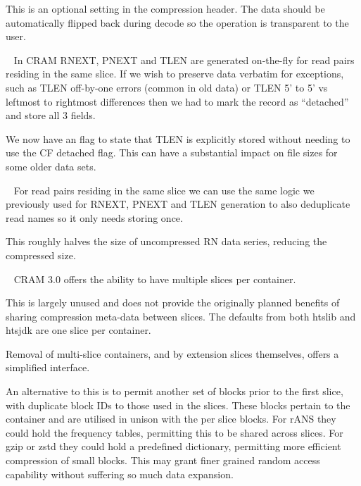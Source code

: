 \documentclass[a4paper]{article}
\begin{document}
\begin{description}
  This is an optional setting in the compression header.  The data
  should be automatically flipped back during decode so the operation
  is transparent to the user.


\item[New CF explicit template size flag]\ \newline
  In CRAM RNEXT, PNEXT and TLEN are generated on-the-fly for read
  pairs residing in the same slice.  If we wish to preserve data
  verbatim for exceptions, such as TLEN off-by-one errors (common in
  old data) or TLEN 5' to 5' vs leftmost to rightmost differences then
  we had to mark the record as ``detached'' and store all 3 fields.

  We now have an flag to state that TLEN is explicitly stored without
  needing to use the CF detached flag.  This can have a substantial
  impact on file sizes for some older data sets.


\item[Deduplication of read names]\ \newline
  For read pairs residing in the same slice we can use the same logic
  we previously used for RNEXT, PNEXT and TLEN generation to also
  deduplicate read names so it only needs storing once.

  This roughly halves the size of uncompressed RN data series,
  reducing the compressed size.

{\color{gray}
\item[(For consideration) Removal of slices]\ \newline
  CRAM 3.0 offers the ability to have multiple slices per container.
  
  This is largely unused and does not provide the originally planned
  benefits of sharing compression meta-data between slices.  The
  defaults from both htslib and htsjdk are one slice per container.

  Removal of multi-slice containers, and by extension slices
  themselves, offers a simplified interface.

  An alternative to this is to permit another set of blocks prior to
  the first slice, with duplicate block IDs to those used in the
  slices.  These blocks pertain to the container and are utilised in
  unison with the per slice blocks.  For rANS they could hold the
  frequency tables, permitting this to be shared across slices.  For
  gzip or zstd they could hold a predefined dictionary, permitting
  more efficient compression of small blocks.  This may grant finer
  grained random access capability without suffering so much data
  expansion.
}


\end{description}
\end{document}
